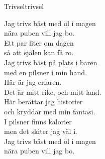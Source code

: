 \begin{song}{Trivsel}{trivsel}
\begin{vers}
Jag trivs bäst med öl i magen\\
nära puben vill jag bo.\\
Ett par liter om dagen\\
så att själen kan få ro.\\
Jag trivs bäst på plats i baren\\
med en pilsner i min hand.\\
Här är jag erfaren.\\
Det är mitt rike, och mitt land.\\
Här berättar jag historier\\
och kryddar med min fantasi.\\
I pilsner finns kalorier\\
men det skiter jag väl i.\\
Jag trivs bäst med öl i magen\\
nära puben vill jag bo.\\
\end{vers}
\end{song}
